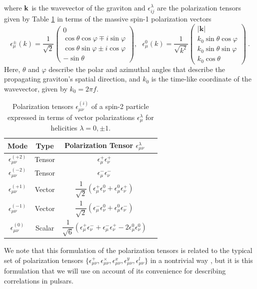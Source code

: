 \documentclass[prd,aps,psfig,nofootinbib,nobibnotes,superscriptaddress,preprintnumbers,times]{revtex4-2}\setlength{\topmargin}{-14mm}
\begin{document}
where ${\bf k}$ is the wavevector of the graviton and $\epsilon^\lambda_{ij}$ are the polarization tensors given by Table \ref{tbl:tensors} in terms of the massive spin-1 polarization vectors
\begin{equation}\label{eqn:pol_vec}
    \epsilon_\mu^{\pm}(k) = \frac{1}{\sqrt{2}} 
\begin{pmatrix}
0 \\
\cos\theta \cos\varphi \mp i \sin\varphi \\
\cos\theta \sin\varphi \pm i \cos\varphi \\
- \sin\theta
\end{pmatrix}
, \ \ \ \epsilon_\mu^{0}(k) = \frac{1}{\sqrt{k^2}} 
\begin{pmatrix}
|\mathbf{k}| \\
k_0 \sin\theta \cos\varphi \\
k_0 \sin\theta \sin\varphi \\
k_0 \cos\theta
\end{pmatrix} \ .
\end{equation}
Here, $\theta$ and $\varphi$ describe the polar and azimuthal angles that describe the propagating graviton's spatial direction, and $k_0$ is the time-like coordinate of the wavevector, given by $k_0 = 2\pi f$. 
\begin{table}[h] 
\centering
\renewcommand{\arraystretch}{1.8}
\begin{tabular}{|c|c|c|l|}
\hline
\textbf{Mode} & \textbf{Type} & \textbf{Polarization Tensor $\epsilon^{\lambda}_{\mu\nu}$} \\
\hline
$\epsilon^{(+2)}_{\mu\nu}$     & Tensor  & $\epsilon^+_\mu \epsilon^+_\nu $ \\
\hline
$\epsilon^{(-2)}_{\mu\nu}$     & Tensor   & $\epsilon^-_\mu \epsilon^-_\nu $ \\
\hline
$\epsilon^{(+1)}_{\mu\nu}$     & Vector   & $\dfrac{1}{\sqrt{2}} \left( \epsilon^+_\mu \epsilon^0_\nu + \epsilon^0_\mu \epsilon^+_\nu \right)$ \\
\hline
$\epsilon^{(-1)}_{\mu\nu}$     & Vector   & $\dfrac{1}{\sqrt{2}} \left( \epsilon^-_\mu \epsilon^0_\nu + \epsilon^0_\mu \epsilon^-_\nu \right)$ \\
\hline
$\epsilon^{(0)}_{\mu\nu}$      & Scalar  & $\dfrac{1}{\sqrt{6}} \left( \epsilon^+_\mu \epsilon^-_\nu + \epsilon^-_\mu \epsilon^+_\nu - 2\epsilon^0_\mu \epsilon^0_\nu \right)$ \\
\hline
\end{tabular}
\caption{Polarization tensors $\epsilon^{(i)}_{\mu\nu}$ of a spin-2 particle expressed in terms of vector polarizations $\epsilon^\lambda_\mu$ for helicities $\lambda = 0, \pm1$.}
\label{tbl:tensors}
\end{table}
We note that this formulation of the polarization tensors is related to the typical set of polarization tensors $\{\epsilon_{\mu\nu}^+, \epsilon_{\mu\nu}^\times, \epsilon_{\mu\nu}^x, \epsilon_{\mu\nu}^y, \epsilon_{\mu\nu}^l \}$ in a nontrivial way \cite{Liang:2021bct}, but it is this formulation that we will use on account of its convenience for describing correlations in pulsars.
\end{document}
